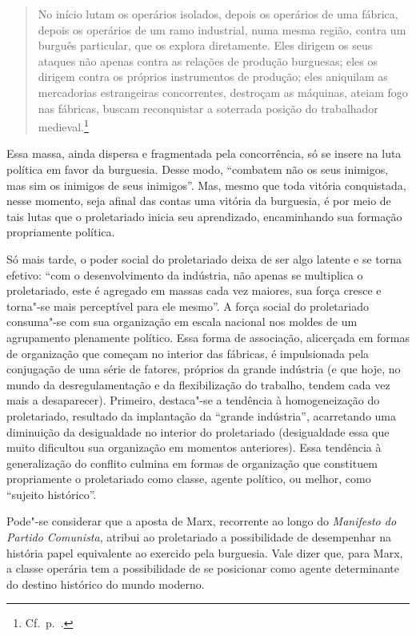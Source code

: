 \begin{quote} 
No início lutam os operários isolados, depois os operários de uma
fábrica, depois os operários de um ramo industrial, numa mesma região,
contra um burguês particular, que os explora diretamente. Eles dirigem os seus
ataques não apenas contra as relações de produção burguesas; eles os
dirigem contra os próprios instrumentos de produção; eles aniquilam as
mercadorias estrangeiras concorrentes, destroçam as máquinas, ateiam
fogo nas fábricas, buscam reconquistar a soterrada posição do
trabalhador medieval.\footnote{ Cf.~p.~\pageref{6}.}
\end{quote} 

Essa massa, ainda dispersa e fragmentada pela concorrência, só
se insere na luta política em favor da burguesia. Desse modo,
“combatem não os seus inimigos, mas sim os inimigos de seus inimigos”.
Mas, mesmo que toda vitória conquistada, nesse momento, seja afinal das
contas uma vitória da burguesia, é por meio de tais lutas que o
proletariado inicia seu aprendizado, encaminhando sua formação
propriamente política.

Só mais tarde, o poder social do proletariado deixa de ser algo latente
e se torna efetivo: “com o desenvolvimento da indústria, não apenas
se multiplica o proletariado, este é agregado em massas cada vez maiores,
sua força cresce e torna"-se mais perceptível para ele mesmo”. A força
social do proletariado consuma"-se com sua organização em escala
nacional nos moldes de um agrupamento plenamente político. Essa forma
de associação, alicerçada em formas de organização que começam no
interior das fábricas, é impulsionada pela conjugação de uma série de
fatores, próprios da grande indústria (e que hoje, no mundo da
desregulamentação e da flexibilização do trabalho, tendem cada vez mais
a desaparecer). Primeiro, destaca"-se a tendência à homogeneização do
proletariado, resultado da implantação da “grande indústria”,
acarretando uma diminuição da desigualdade no interior do proletariado
(desigualdade essa que muito dificultou sua organização em momentos
anteriores). Essa tendência à generalização do conflito culmina em
formas de organização que constituem propriamente o proletariado como
classe, agente político, ou melhor, como “sujeito histórico”.

Pode"-se considerar que a aposta de Marx, recorrente ao longo do
\textit{Manifesto do Partido Comunista}, atribui ao proletariado a
possibilidade de desempenhar na história papel equivalente ao exercido
pela burguesia. Vale dizer que, para Marx, a classe operária tem a
possibilidade de se posicionar como agente determinante do destino
histórico do mundo moderno. 


